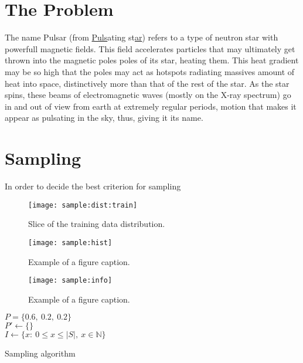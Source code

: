 \documentclass[conference]{IEEEtran}
\begin{document}
\section{The Problem}
The name Pulsar (from \underline{Puls}ating st\underline{ar}) refers to a
type of neutron star with powerfull magnetic fields.\cite{pulsar:definition:nasa}
This field accelerates particles that may ultimately get thrown into the magnetic
poles poles of its star, heating them. This heat gradient may be so high that
the poles may act as hotspots radiating massives amount of heat into space,
distinctively more than that of the rest of the star. As the star spins, 
these beams of electromagnetic waves (mostly on the X-ray spectrum) go in and out
of view from earth at extremely regular periods, motion that makes it appear as
pulsating in the sky, thus, giving it its name.


\section{Sampling}

In order to decide the best criterion for sampling


\begin{figure}[h]
    \texttt{[image: sample:dist:train]}
    \caption{Slice of the training data distribution. \label{fig:sample:dist:train}}
\end{figure}

\begin{figure*}[h]
    \texttt{[image: sample:hist]}
    \caption{Example of a figure caption. \label{fig:sample:hist}}
\end{figure*}

\begin{figure}[h]
    \texttt{[image: sample:info]}
    \caption{Example of a figure caption. \label{fig:sample:info}}
\end{figure}

\begin{algorithm}
    $P = \{0.6,\ 0.2,\ 0.2\}$\\
    $P' \gets \{\}$\\
    $I \gets \{x:\ 0\leq x\leq \lvert S\rvert,\ x\in\mathbb{N}\}$\\
    \caption{Sampling algorithm}\label{sampling:alg}
\end{algorithm}


\end{document}
